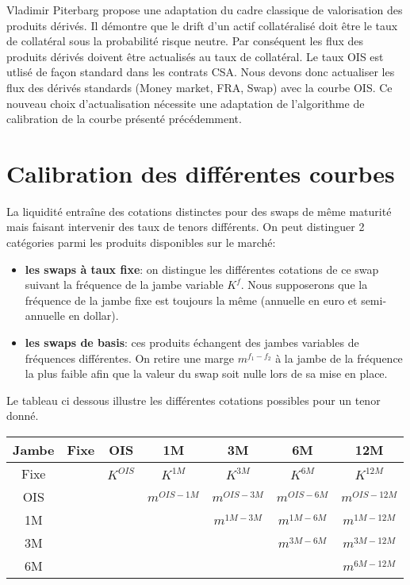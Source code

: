 \documentclass{article}
\begin{document}
Vladimir Piterbarg propose une adaptation du cadre classique de valorisation des produits dérivés. Il démontre que le drift d’un actif collatéralisé doit être le taux de collatéral sous la probabilité risque neutre. Par conséquent les flux des produits dérivés doivent être actualisés au taux de collatéral. Le taux OIS est utlisé de façon standard dans les contrats CSA. Nous devons donc actualiser les flux des dérivés standards (Money market, FRA, Swap) avec la courbe OIS. Ce nouveau choix d'actualisation nécessite une adaptation de l'algorithme de calibration de la courbe présenté précédemment.\\

\section*{Calibration des différentes courbes}

La liquidité entraîne des cotations distinctes pour des swaps de même maturité mais faisant intervenir des taux de tenors différents. On peut distinguer 2 catégories parmi les produits disponibles sur le marché:\\
\begin{itemize}
\item \textbf{les swaps à taux fixe}: on distingue les différentes cotations de ce swap suivant la fréquence de la jambe variable $K^f$. Nous supposerons que la fréquence de la jambe fixe est toujours la même (annuelle en euro et semi-annuelle en dollar).\\

\item \textbf{les swaps de basis}: ces produits échangent des jambes variables de fréquences différentes. On retire une marge $m^{f_1-f_2}$ à la jambe de la fréquence la plus faible afin que la valeur du swap soit nulle lors de sa mise en place.\\ 

\end{itemize}

Le tableau ci dessous illustre les différentes cotations possibles pour un tenor donné.

\begin{center}
\begin{tabular}{|c|c|c|c|c|c|c|}
\hline
Jambe&Fixe&OIS&1M&3M&6M&12M\\
\hline
Fixe&&$K^{OIS}$&$K^{1M}$&$K^{3M}$&$K^{6M}$&$K^{12M}$\\
OIS&&&$m^{OIS-1M}$&$m^{OIS-3M}$&$m^{OIS-6M}$&$m^{OIS-12M}$\\
1M&&&&$m^{1M-3M}$&$m^{1M-6M}$&$m^{1M-12M}$\\
3M&&&&&$m^{3M-6M}$&$m^{3M-12M}$\\
6M&&&&&&$m^{6M-12M}$\\
\hline
\end{tabular}
\end{center}
\end{document}
